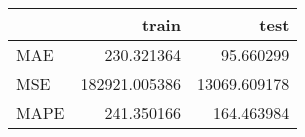 \begin{tabular}{lrr}
\toprule
{} &          train &          test \\
\midrule
MAE  &     230.321364 &     95.660299 \\
MSE  &  182921.005386 &  13069.609178 \\
MAPE &     241.350166 &    164.463984 \\
\bottomrule
\end{tabular}
